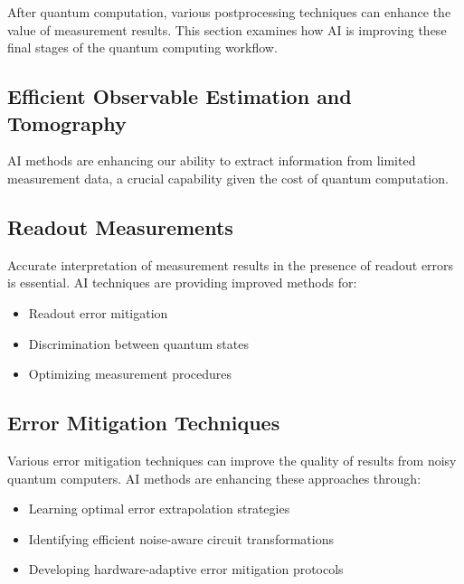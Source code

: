 
After quantum computation, various postprocessing techniques can enhance the value of measurement results. This section examines how AI is improving these final stages of the quantum computing workflow.

\subsection{Efficient Observable Estimation and Tomography}
AI methods are enhancing our ability to extract information from limited measurement data, a crucial capability given the cost of quantum computation.

\subsection{Readout Measurements}
Accurate interpretation of measurement results in the presence of readout errors is essential. AI techniques are providing improved methods for:

\begin{itemize}
    \item Readout error mitigation
    \item Discrimination between quantum states
    \item Optimizing measurement procedures
\end{itemize}

\subsection{Error Mitigation Techniques}
Various error mitigation techniques can improve the quality of results from noisy quantum computers. AI methods are enhancing these approaches through:

\begin{itemize}
    \item Learning optimal error extrapolation strategies
    \item Identifying efficient noise-aware circuit transformations
    \item Developing hardware-adaptive error mitigation protocols
\end{itemize} 
